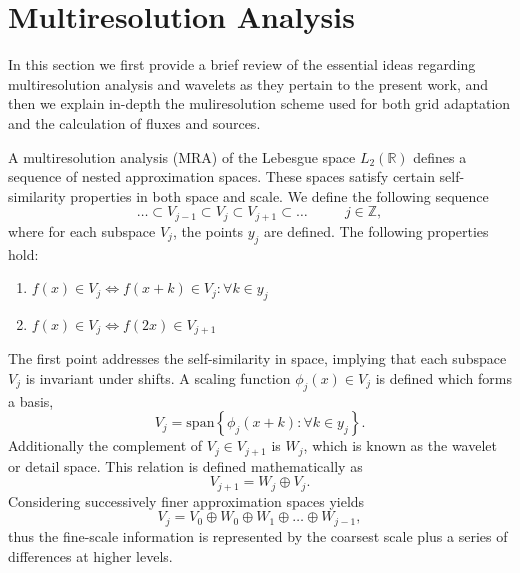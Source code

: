 \documentclass{article}
\begin{document}


    \begin{figure}[H]
        \center
        
        \caption{}
    \end{figure}

\section{Multiresolution Analysis}

    In this section we first provide a brief review of the essential ideas
    regarding multiresolution analysis and wavelets as they pertain to the
    present work, and then we explain in-depth the muliresolution scheme used
    for both grid adaptation and the calculation of fluxes and sources.

    A multiresolution analysis (MRA) of the Lebesgue space
    $L_{2}(\mathbb{R})$ defines a sequence of nested approximation spaces.
    These spaces satisfy certain self-similarity properties in both space
    and scale. We define the following sequence
    \begin{equation*}
        \dots \subset V_{j-1} \subset V_{j} \subset V_{j+1} \subset \dots \text{ }
        \text{ } \text{ } \text{ } j\in \mathbb{Z},
    \end{equation*}
    where for each subspace $V_{j}$, the points $y_{j}$ are defined. The
    following properties hold:
    \begin{enumerate}
        \item $f(x) \in V_{j} \Leftrightarrow f(x+k) \in V_{j} : \forall k
            \in y_{j}$
        \item $f(x) \in V_{j} \Leftrightarrow f(2x) \in V_{j+1}$ 
    \end{enumerate}
    The first point addresses the self-similarity in space, implying that
    each subspace $V_{j}$ is invariant under shifts. A scaling function
    $\phi_{j}(x) \in V_{j}$ is defined which forms a basis,
    \begin{equation*}
        V_{j} = \text{span} \left\{ \phi_{j}(x+k) : \forall k \in y_{j}
        \right\}.
    \end{equation*}
    Additionally the complement of $V_{j} \in V_{j+1}$ is $W_{j}$, which is
    known as the wavelet or detail space. This relation is defined
    mathematically as
    \begin{equation*}
        V_{j+1} = W_{j} \oplus V_{j}.
    \end{equation*}
    Considering successively finer approximation spaces yields
    \begin{equation*}
        V_j = V_0 \oplus W_0 \oplus W_1 \oplus \dots \oplus W_{j-1},
    \end{equation*}
    thus the fine-scale information is represented by the coarsest scale
    plus a series of differences at higher levels.
\end{document}
